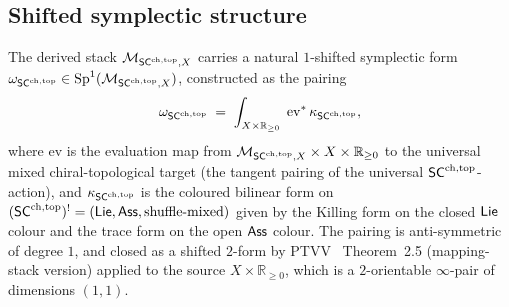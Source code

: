\subsection{Shifted symplectic structure}\label{subsec:shifted-symplectic}

\begin{theorem}
\label{thm:moduli-sc-shifted-symplectic}%
%
The derived stack $\mathcal{M}_{\mathsf{SC}^{\mathrm{ch},\mathrm{top}},X}$ carries a natural
$1$-shifted symplectic form $\omega_{\mathsf{SC}^{\mathrm{ch},\mathrm{top}}}\in
\mathrm{Sp}^1(\mathcal{M}_{\mathsf{SC}^{\mathrm{ch},\mathrm{top}},X})$, constructed as the pairing
\begin{equation}
 \label{eq:moduli-shifted-sympl}
 \omega_{\mathsf{SC}^{\mathrm{ch},\mathrm{top}}}
 \;=\;
 \int_{X\times\mathbb{R}_{\geq 0}}\;
 \mathrm{ev}^{*}\,\kappa_{\mathsf{SC}^{\mathrm{ch},\mathrm{top}}},
\end{equation}
where $\mathrm{ev}$ is the evaluation map from
$\mathcal{M}_{\mathsf{SC}^{\mathrm{ch},\mathrm{top}},X}\times X\times\mathbb{R}_{\geq 0}$ to the
universal mixed chiral-topological target (the tangent pairing of the universal
$\mathsf{SC}^{\mathrm{ch},\mathrm{top}}$-action), and $\kappa_{\mathsf{SC}^{\mathrm{ch},\mathrm{top}}}$ is the coloured bilinear
form on $(\mathsf{SC}^{\mathrm{ch},\mathrm{top}})^{!}=(\mathsf{Lie},\mathsf{Ass},\text{shuffle-mixed})$ given by
the Killing form on the closed $\mathsf{Lie}$ colour and the trace form on
the open $\mathsf{Ass}$ colour. The pairing is anti-symmetric of degree $1$,
and closed as a shifted $2$-form by PTVV~\cite{PTVV13}
Theorem~2.5 (mapping-stack version) applied to the source
$X\times\mathbb{R}_{\geq 0}$, which is a $2$-orientable $\infty$-pair
of dimensions $(1,1)$.
\end{theorem}

